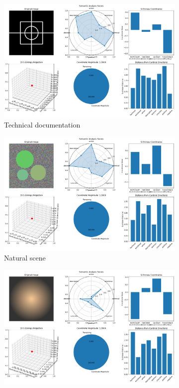\documentclass[11pt,a4paper]{article}
\begin{document}
\begin{figure}[htbp]
\centering
\begin{subfigure}{0.32\textwidth}
\includegraphics[width=\textwidth]{images/s_entropy_demo_technical_image.png}
\caption{Technical documentation}
\end{subfigure}
\hfill
\begin{subfigure}{0.32\textwidth}
\includegraphics[width=\textwidth]{images/s_entropy_demo_natural_image.png}
\caption{Natural scene}
\end{subfigure}
\hfill
\begin{subfigure}{0.32\textwidth}
\includegraphics[width=\textwidth]{images/s_entropy_demo_emotional_image.png}

\end{subfigure}
\end{figure}
\end{document}
